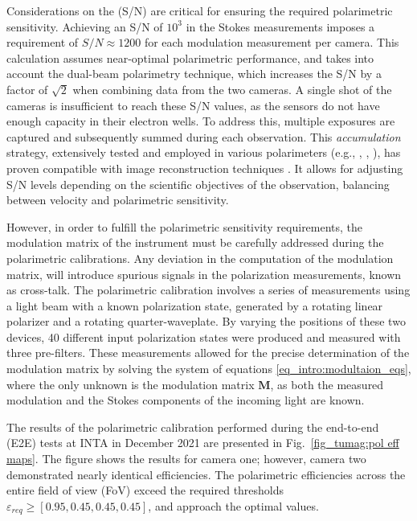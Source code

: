 Considerations on the (S/N) are critical for ensuring the required polarimetric sensitivity. Achieving an S/N of $10^3$ in the Stokes measurements imposes a requirement of $S/N \approx 1200$  for each modulation measurement per camera. This calculation assumes near-optimal polarimetric performance, and takes into account the dual-beam polarimetry technique, which increases the S/N by a factor of $\sqrt{2}$ when combining data from the two cameras. A single shot of the cameras is insufficient to reach these S/N values, as the sensors do not have enough capacity in their electron wells. To address this, multiple exposures are captured and subsequently summed during each observation. This \textit{accumulation} strategy, extensively tested and employed in various polarimeters (e.g., \citealt{accs1}, \citealt{accs2}, \citealt{accs3}), has proven compatible with image reconstruction techniques \citep{accs-image1, accs-image2}. It allows for adjusting S/N levels depending on the scientific objectives of the observation, balancing between velocity and polarimetric sensitivity.

However, in order to fulfill the polarimetric sensitivity requirements, the modulation matrix of the instrument must be carefully addressed during the polarimetric calibrations. Any deviation in the computation of the modulation matrix, will introduce spurious signals in the polarization measurements, known as cross-talk. The polarimetric calibration involves a series of measurements using a light beam with a known polarization state, generated by a rotating linear polarizer and a rotating quarter-waveplate. By varying the positions of these two devices, 40 different input polarization states were produced and measured with three pre-filters. These measurements allowed for the precise determination of the modulation matrix by solving the system of equations \eqref{eq_intro:modultaion_eqs}, where the only unknown is the modulation matrix $\textbf{M}$, as both the measured modulation and the Stokes components of the incoming light are known.

The results of the polarimetric calibration performed during the end-to-end (E2E) tests at INTA in December 2021 are presented in Fig.~\ref{fig_tumag:pol eff maps}. The figure shows the results for camera one; however, camera two demonstrated nearly identical efficiencies. The polarimetric efficiencies across the entire field of view (FoV) exceed the required thresholds $\varepsilon _{req} \geqslant [0.95, 0.45, 0.45, 0.45]$, and approach the optimal values.


